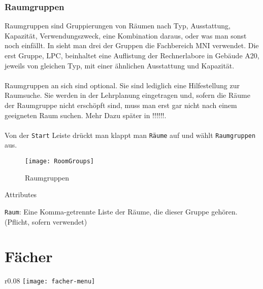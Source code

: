 \subsubsection{Raumgruppen}

Raumgruppen sind Gruppierungen von Räumen nach Typ, Ausstattung, Kapazität, Verwendungszweck, eine Kombination daraus, oder was man sonst noch einfällt. In  sieht man drei der Gruppen die Fachbereich MNI verwendet. Die erst Gruppe, LPC, beinhaltet eine Auflistung der Rechnerlabore in Gebäude A20, jeweils von gleichen Typ, mit einer ähnlichen Ausstattung und Kapazität.\\
\\
Raumgruppen an sich sind optional. Sie sind lediglich eine Hilfestellung zur Raumsuche. Sie werden in der Lehrplanung eingetragen und, sofern die Räume der Raumgruppe nicht erschöpft sind, muss man erst gar nicht nach einem geeigneten Raum suchen. Mehr Dazu später in !!!!!!.\\
\\ 
Von der \texttt{Start} Leiste drückt man klappt man \texttt{Räume} auf und wählt \texttt{Raumgruppen} aus.

\begin{figure}[h]
	\centering
	\texttt{[image: RoomGroups]}
	\vspace{-5pt}
	\caption{Raumgruppen}
	\label{fig:roomgroups}
\end{figure}

\noindent
{\large Attributes\par}
\vspace{8pt}

\noindent
\texttt{Raum}: Eine Komma-getrennte Liste der Räume, die dieser Gruppe gehören. (Pflicht, sofern verwendet)\\

\newpage

\section{Fächer}

\begin{wrapfigure}{r}{0.08\textwidth}
	\vspace{-80pt}
	\texttt{[image: facher-menu]}
\end{wrapfigure}

\vspace{35pt}

